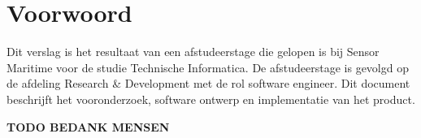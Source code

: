 \chapter*{Voorwoord}
Dit verslag is het resultaat van een afstudeerstage die gelopen is bij Sensor Maritime voor de studie Technische Informatica. De afstudeerstage is gevolgd op de afdeling Research \& Development met de rol software engineer. Dit document beschrijft het vooronderzoek, software ontwerp en implementatie van het product. \newline

{\color{red} \textbf{TODO BEDANK MENSEN}}